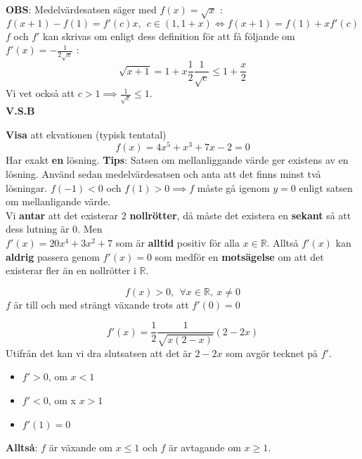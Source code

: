 \documentclass{report}
\begin{document}
{
\textbf{OBS}: Medelvärdesatsen säger med $ f(x) = \sqrt{x}  $ :
\begin{equation*}
f(x+1)-f(1) = f'(c)x,\:\:c \in (1,1+x) \iff f(x+1) = f(1) +xf'(c)
\end{equation*}
	$ f $ och $ f' $ kan skrivas om enligt dess definition för att få följande om $ f'(x) = - \frac{1}{2 \sqrt{x} }  $ :
\begin{equation*}
\sqrt{x+1} = 1 + x \frac{1}{2} \frac{1}{ \sqrt{c} } \le 1 + \frac{x}{2} 
\end{equation*}
Vi vet också att $ c > 1 \implies \frac{1}{ \sqrt{c} } \le 1 $.\\
\textbf{V.S.B} 
}

\qs{}
{
\textbf{Visa} att ekvationen (typisk tentatal)
\begin{equation*}
f(x) = 4x^5+x^3+7x-2=0
\end{equation*}
Har exakt \textbf{en} lösning. \textbf{Tips}: Satsen om mellanliggande värde ger existens av en lösning. Använd sedan medelvärdesatsen och anta att det finns minst två lösningar.
}
\sol $ f(-1) < 0 $ och $ f(1) > 0 \implies f$ måste gå igenom $ y=0 $ enligt satsen om mellanligande värde.\\
Vi \textbf{antar} att det existerar 2 \textbf{nollrötter}, då måste det existera en \textbf{sekant} så att dess lutning är 0. Men\\
$ f'(x) = 20x^4+3x^2+7 $ som är \textbf{alltid} positiv för alla $ x \in \mathbb{R} $. Alltså $ f'(x) $ kan \textbf{aldrig} passera genom $ f'(x) = 0 $ som medför en \textbf{motsägelse} om att det existerar fler än en nollrötter i $ \mathbb{R} $.     

\vspace{30pt}
{
\begin{equation*}
f(x) > 0,\:\: \forall x \in \mathbb{R},\:x \ne 0
\end{equation*}
$ f $ är till och med strängt växande trots att $ f'(0) = 0 $ 
}

{
\begin{equation*}
f'(x) = \frac{1}{2} \frac{1}{ \sqrt{x(2-x)} } (2-2x)
\end{equation*}
Utifrån det kan vi dra slutsatsen att det är $ 2-2x $ som avgör tecknet på $ f' $.
\begin{itemize}
	\item $ f' > 0 $, om $ x < 1 $
	\item $ f' < 0 $, om x $ x > 1 $
	\item $ f'(1) = 0 $ 
\end{itemize}
\textbf{Alltså}: $ f $ är växande om $ x \le 1 $ och $ f $ är avtagande om $ x \ge 1 $.
}
\pagebreak
\end{document}
